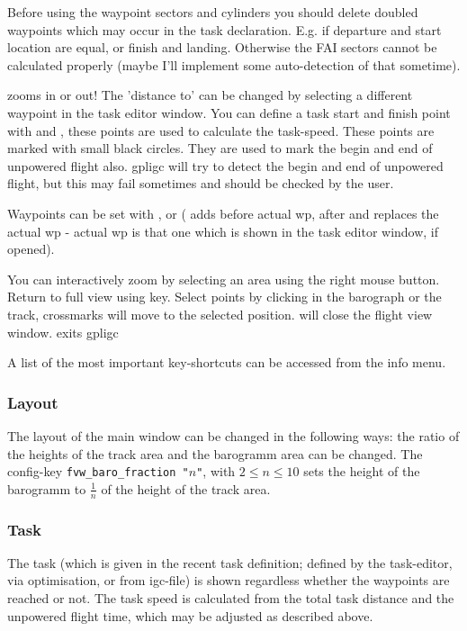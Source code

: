Before using the waypoint sectors and cylinders you should delete doubled waypoints which may occur in the task declaration. E.g. if departure and start location are equal, or finish and landing.
Otherwise the FAI sectors cannot be calculated properly (maybe I'll implement some auto-detection of that sometime).

 zooms in or out!
The 'distance to' can be changed by selecting a different waypoint in the task editor window.
You can define a task start and finish point with  and , these points are
used to calculate the task-speed. These points are marked with small black circles.
They are used to mark the begin and end of unpowered flight also.
gpligc will try to detect the begin and end of unpowered flight, but this may fail sometimes and should be checked by the user.

Waypoints can be set with ,  or  ( adds before actual wp,  after and 
replaces the actual wp - actual wp is that one which is shown in the task editor window, if opened).

You can interactively zoom by selecting an area using the right mouse button. Return to full view using  key.
Select points by clicking in the barograph or the track, crossmarks will move to the selected position.
 will close the flight view window.
 exits gpligc

A list of the most important key-shortcuts can be accessed from the info menu.

\subsubsection{Layout}
The layout of the main window can be changed in the following ways:
the ratio of the heights of the track area and the barogramm area can be changed.
The config-key \texttt{fvw\_baro\_fraction "$n$"}, with $2 \le n \le 10$ sets the height of the barogramm to $\frac{1}{n}$ of the height of the track area.


\subsubsection{Task}
The task (which is given in the recent task definition; defined by the task-editor, via optimisation, or from igc-file) is shown regardless whether the waypoints are reached or not.
The task speed is calculated from the total task distance and the unpowered flight time, which may be adjusted as described above.


